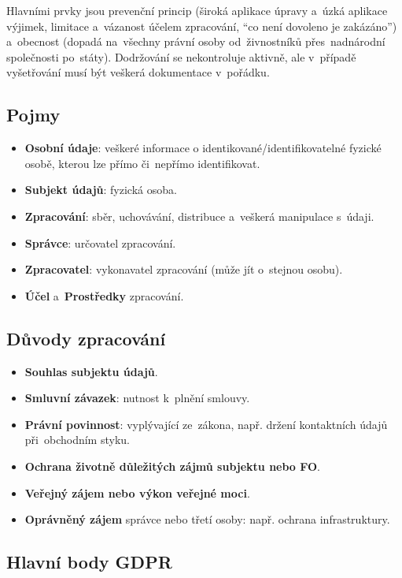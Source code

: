 Hlavními prvky jsou prevenční princip (široká aplikace úpravy a~úzká aplikace výjimek, limitace a~vázanost účelem zpracování, \enquote{co není dovoleno je zakázáno}) a~obecnost (dopadá na~všechny právní osoby od~živnostníků přes~nadnárodní společnosti po~státy). Dodržování se nekontroluje aktivně, ale v~případě vyšetřování musí být veškerá dokumentace v~pořádku.

\subsection*{Pojmy}

\begin{itemize}
\item \textbf{Osobní údaje}: veškeré informace o identikované/identifikovatelné fyzické osobě, kterou lze přímo či~nepřímo identifikovat.
\item \textbf{Subjekt údajů}: fyzická osoba.
\item \textbf{Zpracování}: sběr, uchovávání, distribuce a~veškerá manipulace s~údaji.
\item \textbf{Správce}: určovatel zpracování.
\item \textbf{Zpracovatel}: vykonavatel zpracování (může jít o~stejnou osobu).
\item \textbf{Účel} a~\textbf{Prostředky} zpracování.
\end{itemize}

\subsection*{Důvody zpracování}

\begin{itemize}
\item \textbf{Souhlas subjektu údajů}.
\item \textbf{Smluvní závazek}: nutnost k~plnění smlouvy.
\item \textbf{Právní povinnost}: vyplývající ze~zákona, např. držení kontaktních údajů při~obchodním styku.
\item \textbf{Ochrana životně důležitých zájmů subjektu nebo FO}.
\item \textbf{Veřejný zájem nebo výkon veřejné moci}.
\item \textbf{Oprávněný zájem} správce nebo třetí osoby: např. ochrana infrastruktury.
\end{itemize}

\subsection{Hlavní body GDPR}

